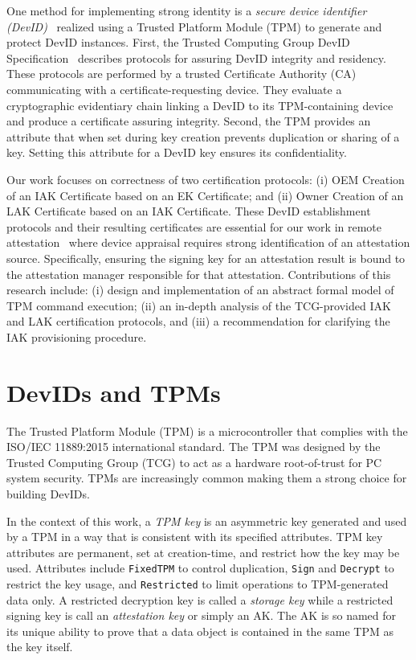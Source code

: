 \documentclass[runningheads]{llncs}
\begin{document}
One method for implementing strong identity is a \emph{secure device
  identifier (DevID)}~\citep{DevIDSpec-IEEE} realized using a Trusted
Platform Module (TPM) to generate and protect DevID instances.  First,
the Trusted Computing Group DevID Specification~\citep{DevIDSpec-TCG}
describes protocols for assuring DevID integrity and residency. These
protocols are performed by a trusted Certificate Authority (CA)
communicating with a certificate-requesting device.  They evaluate a
cryptographic evidentiary chain linking a DevID to its TPM-containing
device and produce a certificate assuring integrity.  Second, the TPM
provides an attribute that when set during key creation
prevents duplication or sharing of a key. Setting this attribute for
a DevID key ensures its confidentiality.

Our work focuses on correctness of two certification protocols:
(i) OEM Creation of an IAK Certificate based on an EK Certificate; and
(ii) Owner Creation of an LAK Certificate based on an IAK
Certificate. These DevID establishment protocols and their resulting
certificates are essential for our work in remote
attestation~\citep{Coker::Principles-of-R,petz2022innovations} where
device appraisal requires strong identification of an attestation
source. Specifically, ensuring the signing key for an attestation
result is bound to the attestation manager responsible for that
attestation.  Contributions of this research include: (i) design and
implementation of an abstract formal model of TPM command execution;
(ii) an in-depth analysis of the TCG-provided IAK and LAK
certification protocols, and (iii) a recommendation for clarifying the
IAK provisioning procedure.

\section{DevIDs and TPMs}
The Trusted Platform Module (TPM) is a microcontroller that complies
with the ISO/IEC 11889:2015 international standard.  The TPM was
designed by the Trusted Computing Group (TCG) to act as a hardware
root-of-trust for PC system security.  TPMs are increasingly common
making them a strong choice for building DevIDs.

In the context of this work, a \emph{TPM key} is an asymmetric key generated
and used by a TPM in a way that is consistent with its specified attributes.
TPM key attributes are permanent, set at creation-time, and restrict how the key may
be used. Attributes include \verb|FixedTPM| to control duplication,
\verb|Sign| and \verb|Decrypt| to restrict the key usage, and
\verb|Restricted| to limit operations to TPM-generated data only.  A
restricted decryption key is called a \emph{storage key} while a
restricted signing key is call an \emph{attestation key} or simply an
AK.  The AK is so named for its unique ability to prove that a data
object is contained in the same TPM as the key itself.
\end{document}
